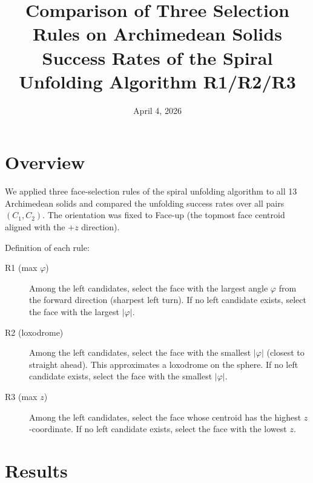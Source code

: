 \documentclass[a4paper,11pt]{article}
\title{Comparison of Three Selection Rules on Archimedean Solids\\
       \large Success Rates of the Spiral Unfolding Algorithm R1/R2/R3}
\author{}
\date{April 4, 2026}
\begin{document}
\maketitle

\section{Overview}

We applied three face-selection rules of the spiral unfolding algorithm to all 13 Archimedean solids
and compared the unfolding success rates over all pairs $(C_1, C_2)$.
The orientation was fixed to Face-up (the topmost face centroid aligned with the $+z$ direction).

\bigskip
\noindent
Definition of each rule:
\begin{description}
  \item[R1 (max $\varphi$)] Among the left candidates, select the face with the largest angle $\varphi$ from the forward direction (sharpest left turn). If no left candidate exists, select the face with the largest $|\varphi|$.
  \item[R2 (loxodrome)] Among the left candidates, select the face with the smallest $|\varphi|$ (closest to straight ahead). This approximates a loxodrome on the sphere. If no left candidate exists, select the face with the smallest $|\varphi|$.
  \item[R3 (max $z$)] Among the left candidates, select the face whose centroid has the highest $z$-coordinate. If no left candidate exists, select the face with the lowest $z$.
\end{description}

\section{Results}
\end{document}
